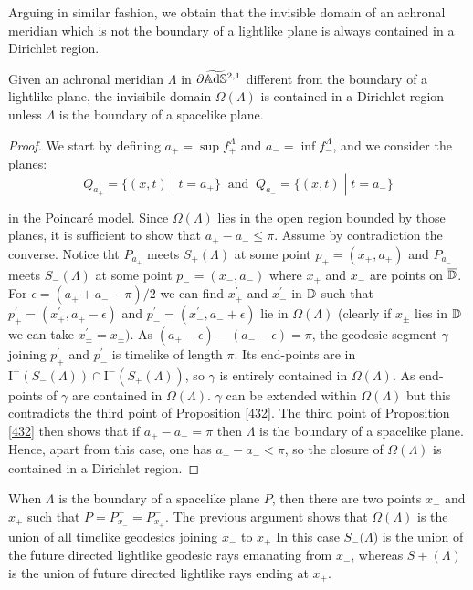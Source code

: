 Arguing in similar fashion, we obtain that the invisible domain of an achronal meridian which is not the boundary of a lightlike plane is always contained in a Dirichlet region. 

\begin{proposition}\label{433}
    Given an achronal meridian $\Lambda$ in $\partial\widetilde{\mathbb{A}\mathrm{d}\mathbb{S}}{}^{2,1}$ different from the boundary of a lightlike plane, the invisibile domain $\Omega(\Lambda)$ is contained in a Dirichlet region unless $\Lambda$ is the boundary of a spacelike plane. 
\end{proposition}
\begin{proof}
    We start by defining $a_+=\sup f_+^{\Lambda}$ and $a_-=\inf f_-^{\Lambda}$, and we consider the planes: 
    \[
        Q_{a_+}=\{(x,t)\;|\;t=a_+\} \;\;\text{and}\;\; Q_{a_-}=\{(x,t)\;|\;t=a_-\}
   \]

   in the Poincaré model. Since $\Omega(\Lambda)$ lies in the open region bounded by those planes, it is sufficient to show that $a_+-a_-\leq\pi.$ Assume by contradiction the converse. Notice tht $P_{a_+}$ meets $S_+(\Lambda)$ at some point $p_+=(x_+,a_+)$ and $P_{a_-}$ meets $S_-(\Lambda)$ at some point $p_-=(x_-,a_-)$ where $x_+$ and $x_-$ are points on $\overline{\mathbb{D}}$. For $\epsilon=(a_+ + a_- -\pi )/2$ we can find $x^{\prime}_+$ and $x_-^{\prime} $ in $\mathbb{D}$ such that $p_+^{\prime}=(x^{\prime}_+,a_+-\epsilon)$ and $p_-^{\prime}=(x_-^{\prime},a_- +\epsilon)$ lie in $\Omega(\Lambda)$ (clearly if $x_\pm$ lies in $\mathbb{D}$ we can take $x_\pm^{\prime}=x_\pm)$. As $(a_+-\epsilon)-(a_- - \epsilon )=\pi$, the geodesic segment $\gamma$ joining $p_+^{\prime}$ and $p_-^{\prime}$ is timelike of length $\pi$. Its end-points are in $\text{I}^+(S_-(\Lambda))\cap\text{I}^-(S_+(\Lambda))$, so $\gamma$ is entirely contained in $\Omega(\Lambda)$. As end-points of $\gamma$ are contained in $\Omega(\Lambda).$ $\gamma$ can be extended within $\Omega(\Lambda)$ but this contradicts the third point of Proposition \ref{432}.       
   The third point of Proposition \ref{432} then shows that if $a_+-a_-=\pi$ then $\Lambda$ is the boundary of a spacelike plane. Hence, apart from this case, one has $a_+ - a_-<\pi$, so the closure of $\Omega(\Lambda)$ is contained in a Dirichlet region. 

\end{proof}
    
\begin{observation}
    When $\Lambda$ is the boundary of a spacelike plane $P$, then there are two points $x_-$ and $x_+$ such that $P=P_{x_-}^+=P_{x_+}^-.$ The previous argument shows that $\Omega(\Lambda)$ is the union of all timelike geodesics joining $x_-$ to $x_+$ In this case $S_-(\Lambda$) is the union of the future directed lightlike geodesic rays emanating from $x_-$, whereas $S+(\Lambda)$ is the union of future directed lightlike rays ending at $x_+$.  
\end{observation}

